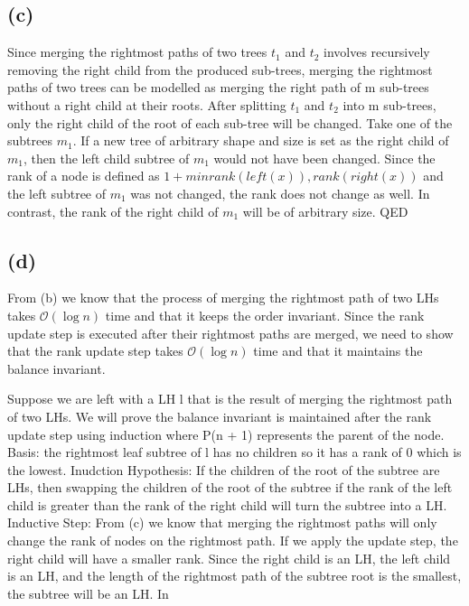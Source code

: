     \subsection{(c)}
     Since merging the rightmost paths of two trees $t_1$ and $t_2$ involves recursively removing the right child from the produced sub-trees, merging the rightmost paths of two trees can be modelled as merging the right path of m sub-trees without a right child at their roots. After splitting $t_1$ and $t_2$ into m sub-trees, only the right child of the root of each sub-tree will be changed. Take one of the subtrees $m_1$. If a new tree of arbitrary shape and size is set as the right child of $m_1$, then the left child subtree of $m_1$ would not have been changed. Since the rank of a node is defined as $1 + min{rank(left(x)), rank(right(x))}$ and the left subtree of $m_1$ was not changed, the rank does not change as well. In contrast, the rank of the right child of $m_1$ will be of arbitrary size. QED

    \subsection{(d)}
    From (b) we know that the process of merging the rightmost path of two LHs takes $\mathcal{O}(\log{n})$ time and that it keeps the order invariant. Since the rank update step is executed after their rightmost paths are merged, we need to show that the rank update step takes $\mathcal{O}(\log{n})$ time and that it maintains the balance invariant.

    Suppose we are left with a LH l that is the result of merging the rightmost path of two LHs.
    We will prove the balance invariant is maintained after the rank update step using induction where P(n + 1) represents the parent of the node.
    Basis: the rightmost leaf subtree of l has no children so it has a rank of 0 which is the lowest.
    Inudction Hypothesis: If the children of the root of the subtree are LHs, then swapping the children of the root of the subtree if the rank of the left child is greater than the rank of the right child will turn the subtree into a LH.
    Inductive Step: From (c) we know that merging the rightmost paths will only change the rank of nodes on the rightmost path. If we apply the update step, the right child will have a smaller rank. Since the right child is an LH, the left child is an LH, and the length of the rightmost path of the subtree root is the smallest, the subtree will be an LH. In 
    
